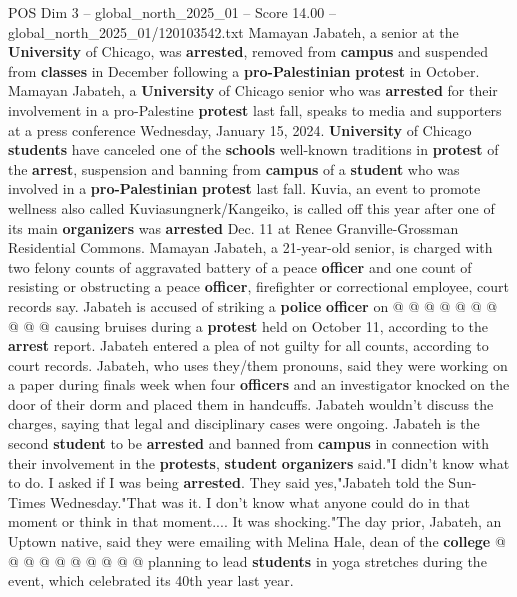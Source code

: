 \begin{textsample}{POS Dim 3 – global\_north\_2025\_01 – Score 14.00 – global\_north\_2025\_01/120103542.txt}  \label{ex:f3_pos_263}
Mamayan Jabateh, a senior at the \textbf{University} of Chicago, was \textbf{arrested}, removed from \textbf{campus} and suspended from \textbf{classes} in December following a \textbf{pro-Palestinian} \textbf{protest} in October.
Mamayan Jabateh, a \textbf{University} of Chicago senior who was \textbf{arrested} for their involvement in a pro-Palestine \textbf{protest} last fall, speaks to media and supporters at a press conference Wednesday, January 15, 2024. \textbf{University} of Chicago \textbf{students} have canceled one of the \textbf{schools} well-known traditions in \textbf{protest} of the \textbf{arrest}, suspension and banning from \textbf{campus} of a \textbf{student} who was involved in a \textbf{pro-Palestinian} \textbf{protest} last fall.
Kuvia, an event to promote wellness also called Kuviasungnerk/Kangeiko, is called off this year after one of its main \textbf{organizers} was \textbf{arrested} Dec. 11 at Renee Granville-Grossman Residential Commons.
Mamayan Jabateh, a 21-year-old senior, is charged with two felony counts of aggravated battery of a peace \textbf{officer} and one count of resisting or obstructing a peace \textbf{officer}, firefighter or correctional employee, court records say.
Jabateh is accused of striking a \textbf{police} \textbf{officer} on @ @ @ @ @ @ @ @ @ @ causing bruises during a \textbf{protest} held on October 11, according to the \textbf{arrest} report.
Jabateh entered a plea of not guilty for all counts, according to court records.
Jabateh, who uses they/them pronouns, said they were working on a paper during finals week when four \textbf{officers} and an investigator knocked on the door of their dorm and placed them in handcuffs.
Jabateh wouldn't discuss the charges, saying that legal and disciplinary cases were ongoing.
Jabateh is the second \textbf{student} to be \textbf{arrested} and banned from \textbf{campus} in connection with their involvement in the \textbf{protests}, \textbf{student} \textbf{organizers} said."I didn't know what to do.
I asked if I was being \textbf{arrested}.
They said yes,"Jabateh told the Sun-Times Wednesday."That was it.
I don't know what anyone could do in that moment or think in that moment....
It was shocking."The day prior, Jabateh, an Uptown native, said they were emailing with Melina Hale, dean of the \textbf{college} @ @ @ @ @ @ @ @ @ @ planning to lead \textbf{students} in yoga stretches during the event, which celebrated its 40th year last year.

\end{textsample}
